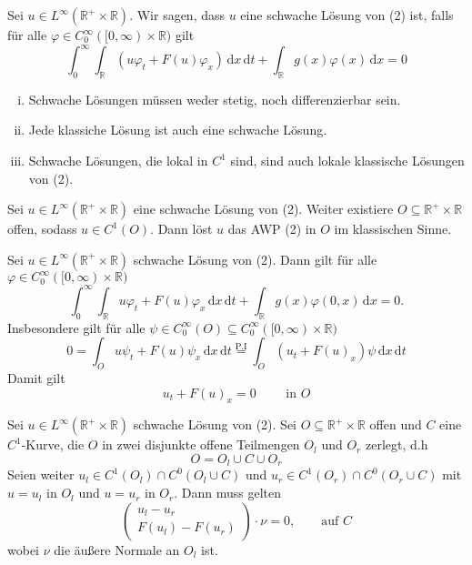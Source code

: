 \begin{definition*}
	Sei $u \in L^{\infty}(\mathbb{R}^+ \times \mathbb{R})$. Wir sagen, dass $u$ eine schwache Lösung von (2) ist, falls für alle $\varphi \in C^{\infty}_0([0,\infty) \times \mathbb{R})$ gilt
	\[
		\int_{0}^{\infty} \int_{\mathbb{R}}^{} (u \varphi_t + F(u) \varphi_x) \,\mathrm{d}x \,\mathrm{d}t + \int_{\mathbb{R}}^{} g(x) \varphi(x) \,\mathrm{d}x = 0
	\]
\end{definition*}
\begin{bemerkung}
	\begin{enumerate}[(i)]
		\item Schwache Lösungen müssen weder stetig, noch differenzierbar sein.
		\item Jede klassiche Lösung ist auch eine schwache Lösung.
		\item Schwache Lösungen, die lokal in $C^1$ sind, sind auch lokale klassische Lösungen von (2). 
	\end{enumerate}
\end{bemerkung}
\begin{lemma}
	Sei $u \in L^{\infty}(\mathbb{R}^+ \times \mathbb{R})$ eine schwache Lösung von (2). Weiter existiere $ O \subseteq  \mathbb{R}^+ \times \mathbb{R}$ offen, sodass $u \in C^1(O)$. Dann löst $u$ das AWP (2) in $O$ im klassischen Sinne.
\end{lemma}
\begin{beweis}
	Sei $u \in L^{\infty}(\mathbb{R}^+ \times \mathbb{R})$ schwache Lösung von (2). Dann gilt für alle $\varphi \in C^{\infty}_0([0,\infty) \times \mathbb{R})$
	\[
		\int_{0}^{\infty} \int_{\mathbb{R}}^{} u \varphi_t + F(u) \varphi_x \,\mathrm{d}x \,\mathrm{d}t + \int_{\mathbb{R}}^{} g(x)\varphi(0,x) \,\mathrm{d}x = 0.
	\]
	Insbesondere gilt für alle $\psi \in C^{\infty}_0(O) \subseteq C_0^{\infty}([0,\infty)\times \mathbb{R})$
	\[
		0 = \int_{O}^{} u \psi_t + F(u) \psi_x \,\mathrm{d}x \,\mathrm{d}t \stackrel{\text{P.I}}{=} \int_{O}^{} (u_t+F(u)_x)\psi \,\mathrm{d}x \,\mathrm{d}t
	\]
	Damit gilt
	\[
		u_t + F(u)_x = 0 \qquad \text{ in }O
	\]
\end{beweis}
\begin{lemma}
	Sei $u \in L^{\infty}(\mathbb{R}^+ \times \mathbb{R})$ schwache Lösung von (2). Sei $O \subseteq \mathbb{R}^+ \times \mathbb{R}$ offen und $C$ eine $C^1$-Kurve, 
	die $O$ in zwei disjunkte offene Teilmengen $O_l$ und $O_r$ zerlegt, d.h 
	\[
	 	O = O_l \cup C \cup O_r
	\]
	Seien weiter $u_l \in C^1(O_l) \cap C^0(O_l \cup C)$ und $u_r \in C^1(O_r) \cap C^0(O_r \cup C)$ mit $u = u_l$ in $O_l$ und $u= u_r$ in $O_r$. Dann muss gelten
	\[
		\begin{pmatrix}
			u_l - u_r \\
			F(u_l)- F(u_r)
		\end{pmatrix} \cdot \nu = 0, \qquad \text{auf }C
	\]
	wobei $\nu$ die äußere Normale an $O_l$ ist.
\end{lemma}
